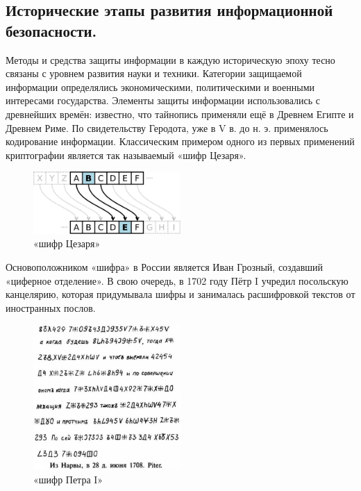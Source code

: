 \subsection{Исторические этапы развития информационной безопасности.}
Методы и средства защиты информации в каждую историческую эпоху тесно связаны с уровнем развития науки и техники. Категории 
защищаемой информации определялись экономическими, политическими и военными интересами государства. Элементы защиты 
информации использовались с древнейших времён: известно, что тайнопись применяли ещё в Древнем Египте и Древнем Риме. По 
свидетельству Геродота, уже в V в. до н. э. применялось кодирование информации. Классическим примером одного из первых 
применений криптографии является так называемый «шифр Цезаря».\cite{urfu}
\begin{figure}[h]
    \centering
    \includegraphics[width=0.5\textwidth]{pic/2.1.png}
    \caption{«шифр Цезаря»}
\end{figure}

Основоположником «шифра» в России является Иван Грозный, создавший «циферное отделение». В свою очередь, в 1702 году Пётр I 
учредил посольскую канцелярию, которая придумывала шифры и занималась расшифровкой текстов от иностранных послов.

\begin{figure}[h]
    \centering
    \includegraphics[width=0.5\textwidth]{pic/2.2.jpg}
    \caption{«шифр Петра I»}
\end{figure}

